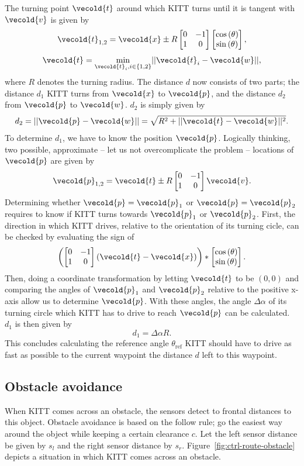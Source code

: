\documentclass[11pt,titlepage]{report}
\let\vec\vecold
\newcommand{\vec}[1]{\mathbf{#1}}
\begin{document}
The turning point $\vec{t}$ around which KITT turns until it is tangent with $\vec{v}$ is given by
\[
	\vec{t}_{1,2} = \vec{x} \pm R \begin{bmatrix}
		0 & -1 \\
		1 & 0
	\end{bmatrix} \begin{bmatrix}
		\cos{(\theta)} \\ \sin{(\theta)}
	\end{bmatrix},
\]
\[
	\vec{t} = \underset{\vec{t}_i, i \in \{1,2\}}{\operatorname{min}} ||\vec{t}_i - \vec{w} ||,
\]
where $R$ denotes the turning radius. The distance $d$ now consists of two parts; the distance $d_1$ KITT turns from $\vec{x}$ to $\vec{p}$, and the distance $d_2$ from $\vec{p}$ to $\vec{w}$. $d_2$ is simply given by
\[
	d_2 = ||\vec{p}-\vec{w}|| = \sqrt{R^2 + ||\vec{t} - \vec{w}||^2}.
\]
To determine $d_1$, we have to know the position $\vec{p}$. Logically thinking, two possible, approximate -- let us not overcomplicate the problem -- locations of $\vec{p}$ are given by
\[
	\vec{p}_{1,2} = \vec{t} \pm R \begin{bmatrix}
		0 & -1 \\
		1 & 0
	\end{bmatrix} \vec{v}.
\]
Determining whether $\vec{p} = \vec{p}_1$ or $\vec{p} = \vec{p}_2$ requires to know if KITT turns towards $\vec{p}_1$ or $\vec{p}_2$. First, the direction in which KITT drives, relative to the orientation of its turning cicle, can be checked by evaluating the sign of
\[
	\left( \begin{bmatrix}
		0 & -1 \\
		1 & 0
	\end{bmatrix} \left( \vec{t} - \vec{x} \right) \right) \ast \begin{bmatrix}
		\cos{(\theta)} \\
		\sin{(\theta)}
	\end{bmatrix}.
\]
Then, doing a coordinate transformation by letting $\vec{t}$ to be $(0,0)$ and comparing the angles of $\vec{p}_1$ and $\vec{p}_2$ relative to the positive x-axis allow us to determine $\vec{p}$. With these angles, the angle $\Delta \alpha$ of its turning circle which KITT has to drive to reach $\vec{p}$ can be calculated. $d_1$ is then given by
\[
	d_1 = \Delta \alpha R.
\]
This concludes calculating the reference angle $\theta_{\text{ref}}$ KITT should have to drive as fast as possible to the current waypoint the distance $d$ left to this waypoint.

\subsection{Obstacle avoidance}
When KITT comes across an obstacle, the sensors detect to frontal distances to this object. Obstacle avoidance is based on the follow rule; go the easiest way around the object while keeping a certain clearance $c$. Let the left sensor distance be given by $s_l$ and the right sensor distance by $s_r$. Figure~\ref{fig:ctrl-route-obstacle} depicts a situation in which KITT comes across an obstacle.
\end{document}
